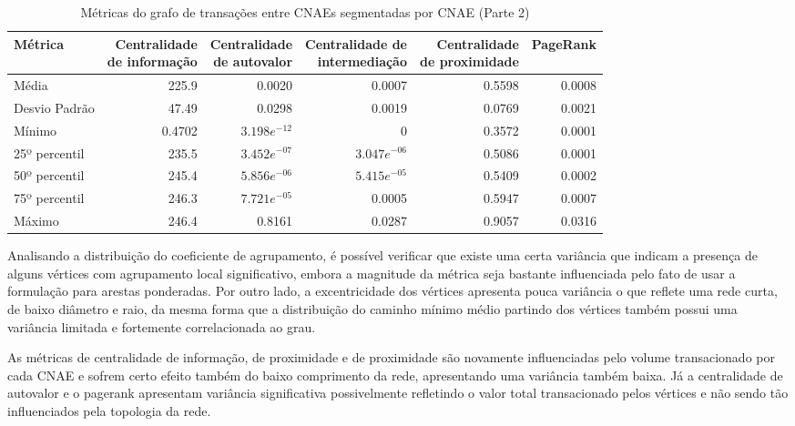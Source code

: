 \begin{table}[htb]
\centering
\caption{Métricas do grafo de transações entre CNAEs segmentadas por CNAE (Parte 2)}
\label{tab:metricas-redes:grafo-por-cnae-especificas2}
\begin{tabular}{l|rrrrr}
\toprule
Métrica & \shortstack{Centralidade\\de informação} & \shortstack{Centralidade\\de autovalor} & \shortstack{Centralidade de\\intermediação} & \shortstack{Centralidade\\de proximidade} & PageRank \\
\midrule
Média         & 225.9    &         0.0020 &         0.0007 & 0.5598 & 0.0008 \\
Desvio Padrão &  47.49   &         0.0298 &         0.0019 & 0.0769 & 0.0021 \\
Mínimo        &   0.4702 & $3.198e^{-12}$ &              0 & 0.3572 & 0.0001 \\
25º percentil & 235.5    & $3.452e^{-07}$ & $3.047e^{-06}$ & 0.5086 & 0.0001 \\
50º percentil & 245.4    & $5.856e^{-06}$ & $5.415e^{-05}$ & 0.5409 & 0.0002 \\
75º percentil & 246.3    & $7.721e^{-05}$ &         0.0005 & 0.5947 & 0.0007 \\
Máximo        & 246.4     &         0.8161 &         0.0287 & 0.9057 & 0.0316 \\
\bottomrule
\end{tabular}
\fdadospesquisa
\end{table}

Analisando a distribuição do coeficiente de agrupamento, é possível verificar que existe uma certa variância que indicam a presença de alguns vértices com agrupamento local significativo, embora a magnitude da métrica seja bastante influenciada pelo fato de usar a formulação para arestas ponderadas. Por outro lado, a excentricidade dos vértices apresenta pouca variância o que reflete uma rede curta, de baixo diâmetro e raio, da mesma forma que a distribuição do caminho mínimo médio partindo dos vértices também possui uma variância limitada e fortemente correlacionada ao grau.

As métricas de centralidade de informação, de proximidade e de proximidade são novamente influenciadas pelo volume transacionado por cada CNAE e sofrem certo efeito também do baixo comprimento da rede, apresentando uma variância também baixa. Já a centralidade de autovalor e o pagerank apresentam variância significativa possivelmente refletindo o valor total transacionado pelos vértices e não sendo tão influenciados pela topologia da rede.

